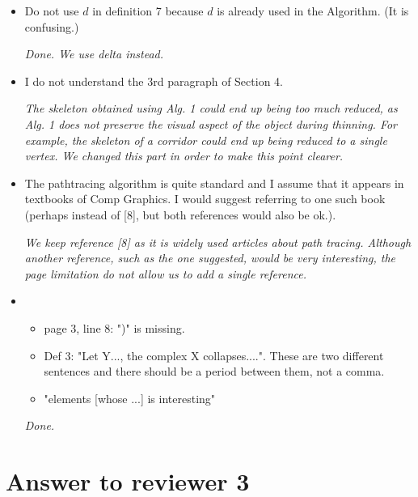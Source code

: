 \documentclass[final,envcountsame]{article}
\begin{document}
\begin{itemize}
\item Do not use $d$ in definition 7 because $d$ is already used in the Algorithm. (It is confusing.)

\textit{Done. We use delta instead.}\\


\item I do not understand the 3rd paragraph of Section 4.

\textit{The skeleton obtained using Alg. 1 could end up being too much reduced, as Alg. 1 does not preserve the visual aspect of the object during thinning. For example, the skeleton of a corridor could end up being reduced to a single vertex. We changed this part in order to make this point clearer.}\\


\item The path­tracing algorithm is quite standard and I assume that it appears in textbooks of Comp Graphics. I would suggest referring to one such book (perhaps instead of [8], but both references would also be ok.).

\textit{We keep reference [8] as it is widely used articles about path tracing. Although another reference, such as the one suggested, would be very interesting, the page limitation do not allow us to add a single reference.}


\item \begin{itemize}

\item page 3, line 8: ")" is missing.
\item Def 3: "Let Y..., the complex X collapses....". These are two different sentences and there should be a period between them, not a comma.
\item "elements [whose ...] is interesting"

\end{itemize}

\textit{Done.}


\end{itemize}


\section{Answer to reviewer 3}
\end{document}
